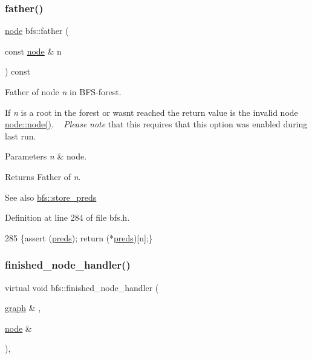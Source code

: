 \subsubsection{\texorpdfstring{father()}{father()}}
{\footnotesize\ttfamily \mbox{\hyperlink{classnode}{node}} bfs\+::father (\begin{DoxyParamCaption}\item[{const \mbox{\hyperlink{classnode}{node}} \&}]{n }\end{DoxyParamCaption}) const\hspace{0.3cm}{\ttfamily [inline]}}



Father of node {\itshape n} in B\+F\+S-\/forest. 

If {\itshape n} is a root in the forest or wasn\textquotesingle{}t reached the return value is the invalid node \mbox{\hyperlink{classnode_a6da4ea35f222059db9a59cf40be459f9}{node\+::node()}}. ~\newline
 {\itshape Please} {\itshape note} that this requires that this option was enabled during last run.


\begin{DoxyParams}{Parameters}
{\em n} & node. \\
\hline
\end{DoxyParams}
\begin{DoxyReturn}{Returns}
Father of {\itshape n}. 
\end{DoxyReturn}
\begin{DoxySeeAlso}{See also}
\mbox{\hyperlink{classbfs_a8c7ce0ea2cd8e1932d1da5693d90cf61}{bfs\+::store\+\_\+preds}} 
\end{DoxySeeAlso}


Definition at line 284 of file bfs.\+h.


\begin{DoxyCode}
285     \{assert (\mbox{\hyperlink{classbfs_a3bac5ed333bb78a30a67099c3b94aa0c}{preds}}); \textcolor{keywordflow}{return} (*\mbox{\hyperlink{classbfs_a3bac5ed333bb78a30a67099c3b94aa0c}{preds}})[n];\}
\end{DoxyCode}
\mbox{\label{classbfs_a4d3f1d569910388b2ccece7cedd8bae4}} 
\subsubsection{\texorpdfstring{finished\+\_\+node\+\_\+handler()}{finished\_node\_handler()}}
{\footnotesize\ttfamily virtual void bfs\+::finished\+\_\+node\+\_\+handler (\begin{DoxyParamCaption}\item[{\mbox{\hyperlink{classgraph}{graph}} \&}]{,  }\item[{\mbox{\hyperlink{classnode}{node}} \&}]{ }\end{DoxyParamCaption})\hspace{0.3cm}{\ttfamily [inline]}, {\ttfamily [virtual]}}



